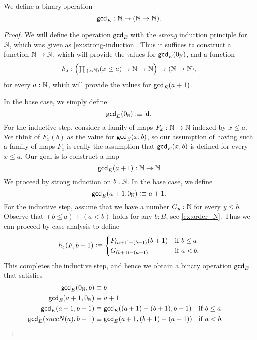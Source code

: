 \begin{defn}
  We define a binary operation
  \begin{equation*}
    \mathsf{gcd}_E:{\mathbb{N}} \to ({\mathbb{N}}\to{\mathbb{N}}).
  \end{equation*}
\end{defn}

\begin{proof}
  We will define the operation $\mathsf{gcd}_E$ with the \emph{strong} induction principle for ${\mathbb{N}}$, which was given as \cref{ex:strong-induction}. Thus it suffices to construct a function ${\mathbb{N}}\to{\mathbb{N}}$, which will provide the values for $\mathsf{gcd}_E(0_{{\mathbb{N}}})$, and a function
  \begin{equation*}
    h_a:\Big(\prd{x:\N}(x\leq a) \to \N\to\N\Big)\to (\N\to\N),
  \end{equation*}
  for every $a:{\mathbb{N}}$, which will provide the values for $\mathsf{gcd}_E(a+1)$.

  In the base case, we simply define
  \begin{equation*}
    \mathsf{gcd}_E(0_{{\mathbb{N}}})\vcentcolon\equiv\mathsf{id}_{}.
  \end{equation*}
  For the inductive step, consider a family of maps $F_x:{\mathbb{N}}\to{\mathbb{N}}$ indexed by $x\leq a$. We think of $F_x(b)$ as the value for $\mathsf{gcd}_E(x,b)$, so our assumption of having such a family of maps $F_x$ is really the assumption that $\mathsf{gcd}_E(x,b)$ is defined for every $x\leq a$. Our goal is to construct a map
  \begin{equation*}
    \mathsf{gcd}_E(a+1):{\mathbb{N}}\to{\mathbb{N}}
  \end{equation*}
  We proceed by strong induction on $b:{\mathbb{N}}$. In the base case, we define
  \begin{equation*}
    \mathsf{gcd}_E(a+1,0_{{\mathbb{N}}})\vcentcolon\equiv a+1.
  \end{equation*}
  For the inductive step, assume that we have a number $G_y:{\mathbb{N}}$ for every $y\leq b$. Observe that $(b\leq a)+(a<b)$ holds for any $b:B$, see \cref{ex:order_N}. Thus we can proceed by case analysis to define
  \begin{equation*}
    h_a(F,b+1)\vcentcolon\equiv
    \begin{cases}
      F_{(a+1)-(b+1)}(b+1) & \text{if }b\leq a\\
      G_{(b+1)-(a+1)} & \text{if }a<b.
    \end{cases}
  \end{equation*}
  This completes the inductive step, and hence we obtain a binary operation
  $\mathsf{gcd}_E$ that satisfies
  \begin{align*}
    \mathsf{gcd}_E(0_{{\mathbb{N}}},b) & \equiv b \\
    \mathsf{gcd}_E(a+1,0_{{\mathbb{N}}}) & \equiv a+1 \\
    \mathsf{gcd}_E(a+1,b+1) & \equiv \mathsf{gcd}_E((a+1)-(b+1),b+1) & & \text{if }b\leq a.\\
    \mathsf{gcd}_E(succN(a),b+1) & \equiv \mathsf{gcd}_E(a+1,(b+1)-(a+1)) & & \text{if }a<b.\qedhere            
  \end{align*}
\end{proof}


